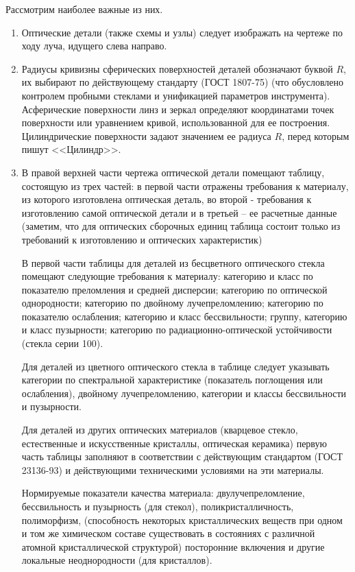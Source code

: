 Рассмотрим наиболее важные из них.
\begin{enumerate}
	\item Оптические детали (также схемы и узлы) следует изображать на чертеже по ходу луча, идущего слева направо.
	\item Радиусы кривизны сферических поверхностей деталей обозначают буквой $ R $, их выбирают по действующему стандарту (ГОСТ 1807-75) (что обусловлено контролем пробными стеклами и унификацией параметров инструмента). Асферические поверхности линз и зеркал определяют координатами точек поверхности или уравнением кривой, использованной для ее построения. Цилиндрические поверхности задают значением ее радиуса $R$, перед которым пишут <<Цилиндр>>.
	\item В правой верхней части чертежа оптической детали помещают таблицу, состоящую из трех частей: в первой части отражены требования к материалу, из которого изготовлена оптическая деталь, во второй - требования к изготовлению самой оптической детали и в третьей -- ее расчетные данные (заметим, что для оптических сборочных единиц таблица состоит только из требований к изготовлению и оптических характеристик)
	
	В первой части таблицы для деталей из бесцветного оптического стекла помещают следующие требования к материалу: категорию и класс по показателю преломления и средней дисперсии; категорию по оптической однородности; категорию по двойному лучепреломлению; категорию по показателю ослабления; категорию и класс бессвильности; группу, категорию и класс пузырности; категорию по радиационно-оптической устойчивости (стекла серии 100).
	
	Для деталей из цветного оптического стекла в таблице следует указывать категории по спектральной характеристике (показатель поглощения или ослабления), двойному лучепреломлению, категории и классы бессвильности и пузырности.
	
	Для деталей из других оптических материалов (кварцевое стекло, естественные и искусственные кристаллы, оптическая керамика) первую часть таблицы заполняют в соответствии с действующим стандартом (ГОСТ 23136-93) и действующими техническими условиями на эти материалы.
	
	Нормируемые показатели качества материала: двулучепреломление, бессвильность и пузырность (для стекол), поликристалличность, полиморфизм, (способность некоторых кристаллических веществ при одном и том же химическом составе существовать в состояниях с различной атомной кристаллической структурой) посторонние включения и другие локальные неоднородности (для кристаллов).
	

\end{enumerate}
